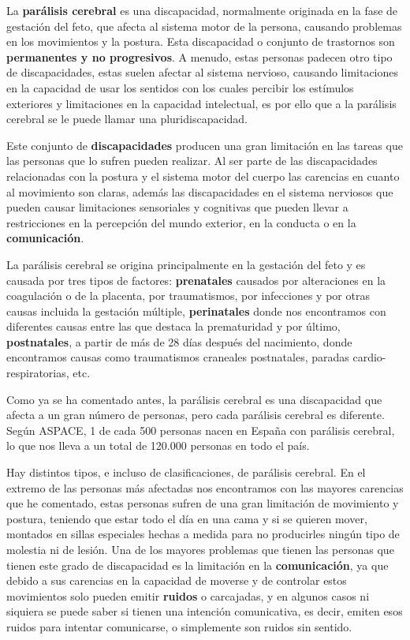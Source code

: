 
La \textbf{parálisis cerebral} es una discapacidad, normalmente originada en la fase de gestación del feto, que afecta al sistema motor de la persona, causando problemas en los movimientos y la postura. Esta discapacidad o conjunto de trastornos son \textbf{permanentes y no progresivos}. A menudo, estas personas padecen otro tipo de discapacidades, estas suelen afectar al sistema nervioso, causando limitaciones en la capacidad de usar los sentidos con los cuales percibir los estímulos exteriores y limitaciones en la capacidad intelectual, es por ello que a la parálisis cerebral se le puede llamar una pluridiscapacidad. \cite{aspacequees,aspacecyl,rosenbaum2007report}

Este conjunto de \textbf{discapacidades} producen una gran limitación en las tareas que las personas que lo sufren pueden realizar. Al ser parte de las discapacidades relacionadas con la postura y el sistema motor del cuerpo las carencias en cuanto al movimiento son claras, además las discapacidades en el sistema nerviosos que pueden causar limitaciones sensoriales y cognitivas que pueden llevar a restricciones en la percepción del mundo exterior, en la conducta o en la \textbf{comunicación}.

La parálisis cerebral se origina principalmente en la gestación del feto y es causada por tres tipos de factores: \textbf{prenatales} causados por alteraciones en la coagulación o de la placenta, por traumatismos, por infecciones y por otras causas incluida la gestación múltiple, \textbf{perinatales} donde nos encontramos con diferentes causas entre las que destaca la prematuridad y por último, \textbf{postnatales}, a partir de más de 28 días después del nacimiento, donde encontramos causas como traumatismos craneales postnatales, paradas cardio-respiratorias, etc.\cite{crene,causas}

Como ya se ha comentado antes, la parálisis cerebral es una discapacidad que afecta a un gran número de personas, pero cada parálisis cerebral es diferente. Según ASPACE, 1 de cada 500 personas nacen en España con parálisis cerebral, lo que nos lleva a un total de 120.000 personas en todo el país.\cite{aspacedatos}

Hay distintos tipos, e incluso de clasificaciones, de parálisis cerebral. En el extremo de las personas más afectadas nos encontramos con las mayores carencias que he comentado, estas personas sufren de una gran limitación de movimiento y postura, teniendo que estar todo el día en una cama y si se quieren mover, montados en sillas especiales hechas a medida para no producirles ningún tipo de molestia ni de lesión. Una de los mayores problemas que tienen las personas que tienen este grado de discapacidad es la limitación en la \textbf{comunicación}, ya que debido a sus carencias en la capacidad de moverse y de controlar estos movimientos solo pueden emitir \textbf{ruidos} o carcajadas, y en algunos casos ni siquiera se puede saber si tienen una intención comunicativa, es decir, emiten esos ruidos para intentar comunicarse, o simplemente son ruidos sin sentido.

